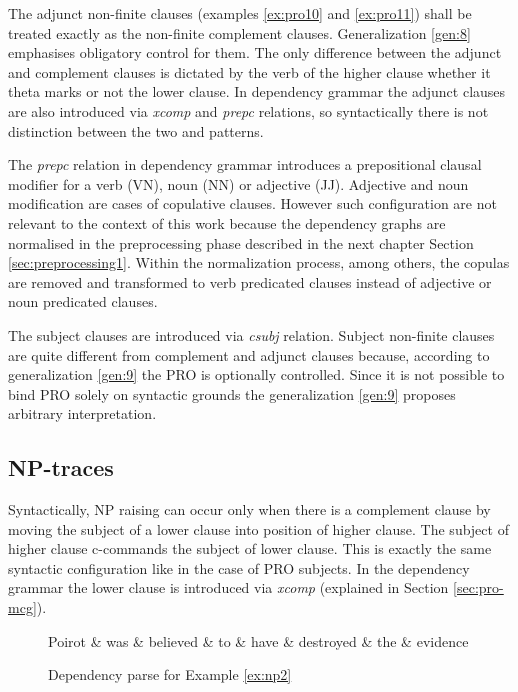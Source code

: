 The adjunct non-finite clauses (examples \ref{ex:pro10} and \ref{ex:pro11}) shall be treated exactly as the non-finite complement clauses. Generalization \ref{gen:8} emphasises obligatory control for them. The only difference between the adjunct and complement clauses is dictated by the verb of the higher clause whether it theta marks or not the lower clause. In dependency grammar the adjunct clauses are also introduced via \textit{xcomp} and \textit{prepc} relations, so syntactically there is not distinction between the two and patterns.

The \textit{prepc} relation in dependency grammar introduces a prepositional clausal modifier for a verb (VN), noun (NN) or adjective (JJ). Adjective and noun modification are cases of copulative clauses. However such configuration are not relevant to the context of this work because the dependency graphs are normalised in the preprocessing phase described in the next chapter Section \ref{sec:preprocessing1}. Within the normalization process, among others, the copulas are removed and transformed to verb predicated clauses instead of adjective or noun predicated clauses.

The subject clauses are introduced via \textit{csubj} relation. Subject non-finite clauses are quite different from complement and adjunct clauses because, according to generalization \ref{gen:9} the PRO is optionally controlled. Since it is not possible to bind PRO solely on syntactic grounds the generalization \ref{gen:9} proposes arbitrary interpretation. 

\subsection{NP-traces}
Syntactically, NP raising can occur only when there is a complement clause by moving the subject of a lower clause into position of higher clause. The subject of higher clause c-commands the subject of lower clause. This is exactly the same syntactic configuration like in the case of PRO subjects. In the dependency grammar the lower clause is introduced via \textit{xcomp} (explained in Section \ref{sec:pro-mcg}).

\begin{figure}[H]
	\centering
	\begin{dependency}
		\begin{deptext}[]
			Poirot \& was \& believed \& to \& have \& destroyed \& the \& evidence \\
		\end{deptext}
	\end{dependency}
	\caption{Dependency parse for Example \ref{ex:np2}}
	\label{fig:np-mcg1}
\end{figure}


